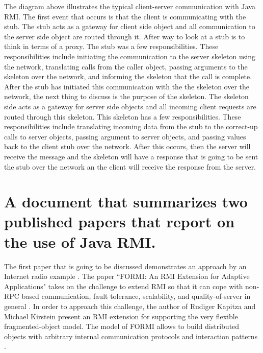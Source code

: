 \documentclass{article}
\begin{document}
The diagram above illustrates the typical client-server communication with Java RMI. The first event that occurs is that the client is communicating with the stub. The stub acts as a gateway for client side object and all communication to the server side object are routed through it. After way to look at a stub is to think in terms of a proxy. The stub was a few responsibilities. These responsibilities include initiating the communication to the server skeleton using the network, translating calls from the caller object, passing arguments to the skeleton over the network, and informing the skeleton that the call is complete. After the stub has initiated this communication with the the skeleton over the network, the next thing to discuss is the purpose of the skeleton. The skeleton side acts as a gateway for server side objects and all incoming client requests are routed through this skeleton. This skeleton has a few responsibilities. These responsibilities include translating incoming data from the stub to the correct-up calls to server objects, passing argument to server objects, and passing values back to the client stub over the network. After this occurs, then the server will receive the message and the skeleton will have a response that is going to be sent the stub over the network an the client will receive the response from the server.
\section{A document that summarizes two published papers that report on the use of Java RMI.}

The first paper that is going to be discussed demonstrates an approach by an Internet radio example \cite{Kapitza:2005:FRE:1101516.1101518}. The paper ``FORMI: An RMI Extension for Adaptive Applications" takes on the challenge to extend RMI so that it can cope with non-RPC based communication, fault tolerance, scalability, and quality-of-server in general \cite{Kapitza:2005:FRE:1101516.1101518}. In order to approach this challenge, the author of Rudiger Kapitza and Michael Kirstein present an RMI extension for supporting the very flexible fragmented-object model. The model of FORMI allows to build distributed objects with arbitrary internal communication protocols and interaction patterns \cite{Kapitza:2005:FRE:1101516.1101518}.
\end{document}
